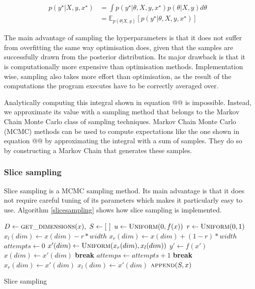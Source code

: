 \documentclass[a4paper,12pt,twoside,openright]{report}
\newcommand{\Break}{\State \textbf{break} }
\begin{document}
\begin{align}
p(y^\star|X,y,x^\star) &= \int p(y^\star|\theta,X,y,x^\star)p(\theta|X,y)d\theta\\
&= \mathbb{E}_{p(\theta|X,y)}[p(y^\star|\theta,X,y,x^\star)]
\end{align}

The main advantage of sampling the hyperparameters is that it does not suffer from overfitting the same way optimisation does, given that the samples are successfully drawn from the posterior distribution. Its major drawback is that it is computationally more expensive than optimisation methods. Implementation wise, sampling also takes more effort than optimisation, as the result of the computations the program executes have to be correctly averaged over.

Analytically computing this integral shown in equation @@ is impossible. Instead, we approximate its value with a sampling method that belongs to the Markov Chain Monte Carlo class of sampling techniques. Markov Chain Monte Carlo (MCMC) methods can be used to compute expectations like the one shown in equation @@ by approximating the integral with a sum of samples. They do so by constructing a Markov Chain that generates these samples.

\subsubsection{Slice sampling}

Slice sampling is a MCMC sampling method. Its main advantage is that it does not require careful tuning of its parameters which makes it particularly easy to use. Algorithm \ref{slicesampling} shows how slice sampling is implemented.



\begin{algorithm}
\begin{algorithmic}[1]
\State $D\gets \Call{get\_dimensions}{x},\ S\gets[\ ]$
\State $u\gets \Call{Uniform}{0, f(x)}$
\State $r\gets \Call{Uniform}{0, 1}$
\State $x_l(dim)\gets x(dim) - r * width$
\State $x_r(dim)\gets x(dim) + (1 - r) * width$
\State $attempts\gets 0$
\Loop
\State $x'(dim) \gets \Call{Uniform}{x_r(dim), x_l(dim)}$
\State $y'\gets f(x')$
  \State $x(dim)\gets x'(dim)$
  \Break
\Else
  \State $attemps \gets attempts + 1$
    \Break
    \State $x_r(dim) \gets x'(dim)$
    \State $x_l(dim) \gets x'(dim)$
  \EndIf
\EndIf
\EndLoop
\EndFor
\State $\Call{append}{S, x}$
\EndFor
\EndProcedure
\end{algorithmic}
\caption{Slice sampling}
\label{slicesampling}
\end{algorithm}
\end{document}
